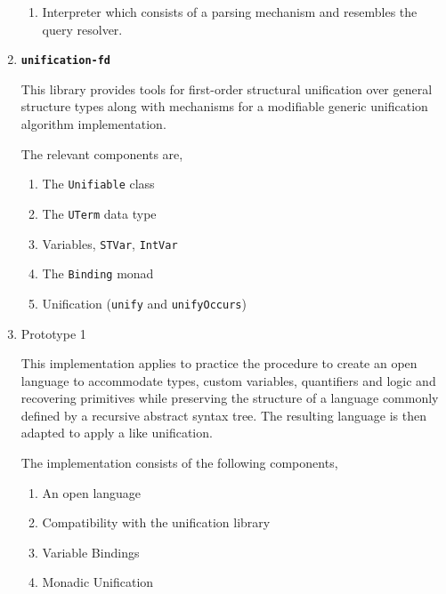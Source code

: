 \documentclass[thesis-solanki.tex]{subfiles}
\providecommand\codeLibrary[1]{\texttt{\bfseries #1}}
\begin{document}
\begin{enumerate}
\begin{enumerate}
\item Interpreter which consists of a parsing mechanism and resembles the query resolver.
\end{enumerate}

\item \codeLibrary{unification-fd} \cite{unification-fd-lib}

This library provides tools for first-order structural unification over general structure types along with mechanisms for a modifiable
generic unification algorithm implementation.

The relevant components are,
\begin{enumerate}
\item The \Verb!Unifiable! class

\item The \Verb!UTerm! data type

\item Variables,
  \Verb!STVar!, \Verb!IntVar!

\item The \Verb!Binding! monad

\item Unification (\Verb!unify! and \Verb!unifyOccurs!)
\end{enumerate}

\item Prototype 1

  This implementation applies to practice the procedure to create an open language to accommodate types,
  custom variables, quantifiers and logic and recovering primitives while preserving the structure of a
  language commonly defined by a recursive abstract syntax tree.
  The resulting language is then adapted to apply a  like unification.

The implementation consists of the following components,
\begin{enumerate}
\item An open language

\item Compatibility with the unification library \cite{unification-fd-lib}

\item Variable Bindings

\item Monadic Unification

\end{enumerate}
\end{enumerate}
\end{document}
